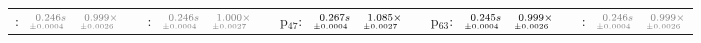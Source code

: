 \documentclass[a4paper,UKenglish]{lipics-v2016}
\begin{document}
\begin{table*}
\begin{adjustbox}{width=1.2\textwidth,center}
\begin{tabular}{rrrp{.1em}rrrp{.1em}rrrp{.1em}rrrp{.1em}rrr}
{\tiny \color{gray}{p$_{15}$}:}&$\substack{\mathmakebox[.7cm][r]{\color{gray}{0.246}}\color{gray}{s}\\{\mathmakebox[.7cm][r]{\scriptscriptstyle \color{gray}{\pm 0.0004}}}}$&$\substack{\mathmakebox[.7cm][r]{\color{gray}{0.999}}\color{gray}{\times}\\{\mathmakebox[.7cm][r]{\scriptscriptstyle \color{gray}{\pm 0.0026}}}}$&&{\tiny \color{gray}{p$_{31}$}:}&$\substack{\mathmakebox[.7cm][r]{\color{gray}{0.246}}\color{gray}{s}\\{\mathmakebox[.7cm][r]{\scriptscriptstyle \color{gray}{\pm 0.0004}}}}$&$\substack{\mathmakebox[.7cm][r]{\color{gray}{1.000}}\color{gray}{\times}\\{\mathmakebox[.7cm][r]{\scriptscriptstyle \color{gray}{\pm 0.0027}}}}$&&{\tiny p$_{47}$:}&$\substack{\mathmakebox[.7cm][r]{0.267}s\\{\mathmakebox[.7cm][r]{\scriptscriptstyle \pm 0.0004}}}$&$\substack{\mathmakebox[.7cm][r]{1.085}\times\\{\mathmakebox[.7cm][r]{\scriptscriptstyle \pm 0.0027}}}$&&{\tiny p$_{63}$:}&$\substack{\mathmakebox[.7cm][r]{0.245}s\\{\mathmakebox[.7cm][r]{\scriptscriptstyle \pm 0.0004}}}$&$\substack{\mathmakebox[.7cm][r]{0.999}\times\\{\mathmakebox[.7cm][r]{\scriptscriptstyle \pm 0.0026}}}$&&{\tiny \color{gray}{p$_{79}$}:}&$\substack{\mathmakebox[.7cm][r]{\color{gray}{0.246}}\color{gray}{s}\\{\mathmakebox[.7cm][r]{\scriptscriptstyle \color{gray}{\pm 0.0004}}}}$&$\substack{\mathmakebox[.7cm][r]{\color{gray}{0.999}}\color{gray}{\times}\\{\mathmakebox[.7cm][r]{\scriptscriptstyle \color{gray}{\pm 0.0026}}}}$\\

\end{tabular}
\end{adjustbox}
\end{table*}
\end{document}
